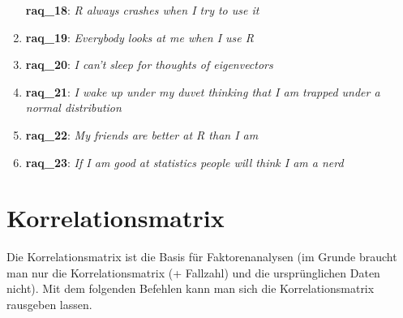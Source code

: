 \documentclass[
  10pt,
  letterpaper,
  a4paper, twoside]{scrreprt}
\begin{document}
\begin{enumerate}
  \textbf{raq\_18}: \emph{R always crashes when I try to use it}
\item
  \textbf{raq\_19}: \emph{Everybody looks at me when I use R}
\item
  \textbf{raq\_20}: \emph{I can't sleep for thoughts of eigenvectors}
\item
  \textbf{raq\_21}: \emph{I wake up under my duvet thinking that I am
  trapped under a normal distribution}
\item
  \textbf{raq\_22}: \emph{My friends are better at R than I am}
\item
  \textbf{raq\_23}: \emph{If I am good at statistics people will think I
  am a nerd}
\end{enumerate}

\section{Korrelationsmatrix}\label{korrelationsmatrix}

Die Korrelationsmatrix ist die Basis für Faktorenanalysen (im Grunde
braucht man nur die Korrelationsmatrix (+ Fallzahl) und die
ursprünglichen Daten nicht). Mit dem folgenden Befehlen kann man sich
die Korrelationsmatrix rausgeben lassen.
\end{document}
